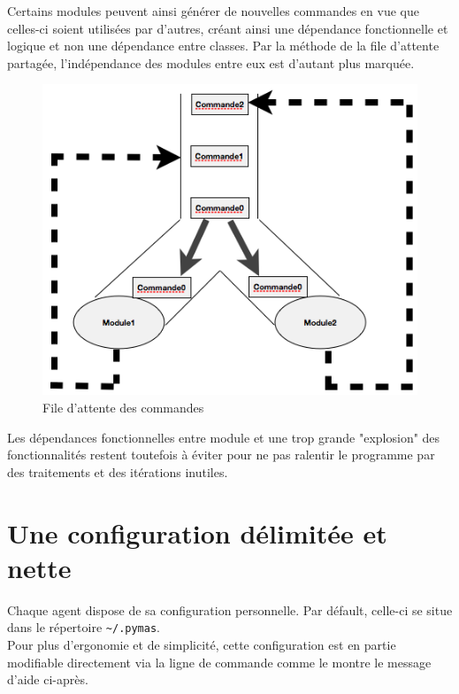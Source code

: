 \documentclass[11pt]{book}
\begin{document}
Certains modules peuvent ainsi générer de nouvelles commandes en vue que 
celles-ci soient utilisées par d'autres, créant ainsi une dépendance 
fonctionnelle et logique et non une dépendance entre classes. Par la méthode 
de la file d'attente partagée, l'indépendance des modules entre eux 
est d'autant plus marquée.

\begin{figure}[h]
  \begin{center}
    \includegraphics[width=12cm]{imgs/command_queue.png}
    \caption{File d'attente des commandes}
  \end{center}
\end{figure}

Les dépendances fonctionnelles entre module et une trop grande "explosion" 
des fonctionnalités restent toutefois à éviter pour ne pas ralentir le 
programme par des traitements et des itérations inutiles.

\section{Une configuration délimitée et nette}
Chaque agent dispose de sa configuration personnelle. Par défault, celle-ci 
se situe dans le répertoire \verb?~/.pymas?. \\
Pour plus d'ergonomie et de simplicité, cette configuration est en partie 
modifiable directement via la ligne de commande comme le montre le message 
d'aide ci-après.
\end{document}
